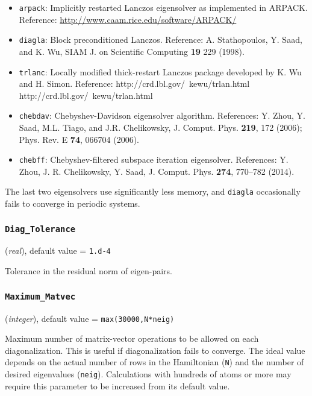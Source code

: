 \documentclass{article}
\begin{document}
\begin{itemize}
\item {\tt arpack}:
Implicitly restarted Lanczos eigensolver as implemented in ARPACK.
Reference: \href{http://www.caam.rice.edu/software/ARPACK/}
{http://www.caam.rice.edu/software/ARPACK/}
\item {\tt diagla}: Block preconditioned Lanczos.
Reference: A. Stathopoulos, Y. Saad, and K. Wu, SIAM J. on Scientific
Computing {\bf 19} 229 (1998).
\item {\tt trlanc}: Locally modified 
thick-restart Lanczos package developed by K. Wu and H. Simon.
Reference: {{http://crd.lbl.gov/~kewu/trlan.html}
{http://crd.lbl.gov/~kewu/trlan.html}}
\item {\tt chebdav}: Chebyshev-Davidson eigensolver algorithm. References:
Y. Zhou, Y. Saad, M.L. Tiago, and J.R. Chelikowsky,
J. Comput. Phys. {\bf 219}, 172 (2006); Phys. Rev. E {\bf 74}, 066704 (2006).
\item {\tt chebff}: Chebyshev-filtered subspace iteration eigensolver. References:
Y. Zhou, J. R. Chelikowsky, Y. Saad,
J. Comput. Phys. {\bf 274}, 770--782 (2014).
\end{itemize}

The last two eigensolvers use significantly less memory, and
{\tt diagla} occasionally fails to converge in periodic systems.

\subsubsection{\tt Diag\_Tolerance 
\label{DiagTolerance}}
({\it real}),
default value = {\tt 1.d-4 }

Tolerance in the residual norm of eigen-pairs.

\subsubsection{\tt Maximum\_Matvec 
\label{MaximumMatvec}}
({\it integer}),
default value = {\tt max(30000,N*neig) }

Maximum number of matrix-vector operations to be allowed on each
diagonalization. This is useful if diagonalization fails to
converge. The ideal value depends on the actual number of rows in the 
Hamiltonian ({\tt N}) and the number of desired eigenvalues ({\tt neig}).
Calculations with hundreds of atoms or more may require this
parameter to be increased from its default value.
\end{document}
